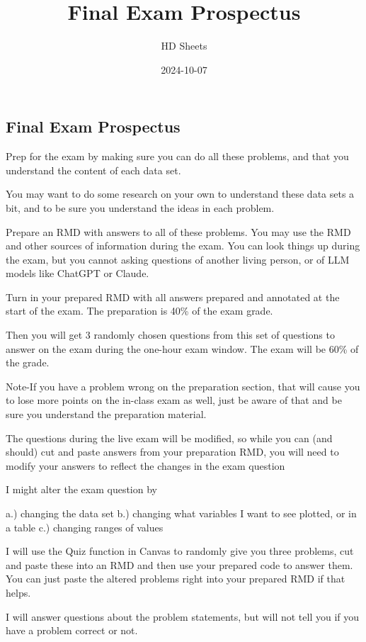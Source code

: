 \documentclass[
]{article}
\title{Final Exam Prospectus}
\author{HD Sheets}
\date{2024-10-07}
\begin{document}
\maketitle

\subsection{Final Exam Prospectus}\label{final-exam-prospectus}

Prep for the exam by making sure you can do all these problems, and that
you understand the content of each data set.

You may want to do some research on your own to understand these data
sets a bit, and to be sure you understand the ideas in each problem.

Prepare an RMD with answers to all of these problems. You may use the
RMD and other sources of information during the exam. You can look
things up during the exam, but you cannot asking questions of another
living person, or of LLM models like ChatGPT or Claude.

Turn in your prepared RMD with all answers prepared and annotated at the
start of the exam. The preparation is 40\% of the exam grade.

Then you will get 3 randomly chosen questions from this set of questions
to answer on the exam during the one-hour exam window. The exam will be
60\% of the grade.

Note-If you have a problem wrong on the preparation section, that will
cause you to lose more points on the in-class exam as well, just be
aware of that and be sure you understand the preparation material.

The questions during the live exam will be modified, so while you can
(and should) cut and paste answers from your preparation RMD, you will
need to modify your answers to reflect the changes in the exam question

I might alter the exam question by

a.) changing the data set b.) changing what variables I want to see
plotted, or in a table c.) changing ranges of values

I will use the Quiz function in Canvas to randomly give you three
problems, cut and paste these into an RMD and then use your prepared
code to answer them. You can just paste the altered problems right into
your prepared RMD if that helps.

I will answer questions about the problem statements, but will not tell
you if you have a problem correct or not.
\end{document}
